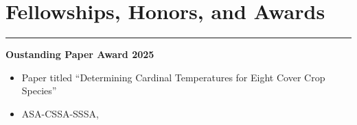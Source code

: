 \documentclass[letterpaper,10pt]{article}
\begin{document}

\section*{\sc Fellowships, Honors, and Awards} 
\hrule
\vspace{.1in}


{\bf Oustanding Paper Award \hfill 2025}
\vspace{-.1in}
\begin{itemize}
\renewcommand\labelitemi{{\boldmath$\cdot$}}
\item Paper titled ``Determining Cardinal
	Temperatures for Eight Cover Crop
	Species''
\item ASA-CSSA-SSSA,
\end{itemize}
\end{document}
